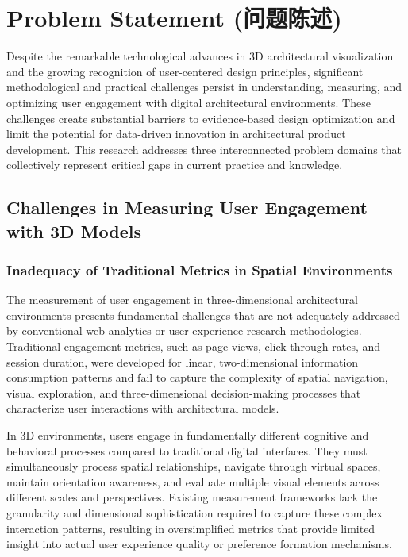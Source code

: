 \section{Problem Statement (问题陈述)}
\label{sec:problem_statement}

Despite the remarkable technological advances in 3D architectural visualization and the growing recognition of user-centered design principles, significant methodological and practical challenges persist in understanding, measuring, and optimizing user engagement with digital architectural environments. These challenges create substantial barriers to evidence-based design optimization and limit the potential for data-driven innovation in architectural product development. This research addresses three interconnected problem domains that collectively represent critical gaps in current practice and knowledge.

\subsection{Challenges in Measuring User Engagement with 3D Models}
\label{subsec:measuring_engagement_challenges}

\subsubsection{Inadequacy of Traditional Metrics in Spatial Environments}
\label{subsubsec:traditional_metrics_inadequacy}

The measurement of user engagement in three-dimensional architectural environments presents fundamental challenges that are not adequately addressed by conventional web analytics or user experience research methodologies. Traditional engagement metrics, such as page views, click-through rates, and session duration, were developed for linear, two-dimensional information consumption patterns and fail to capture the complexity of spatial navigation, visual exploration, and three-dimensional decision-making processes that characterize user interactions with architectural models.

In 3D environments, users engage in fundamentally different cognitive and behavioral processes compared to traditional digital interfaces. They must simultaneously process spatial relationships, navigate through virtual spaces, maintain orientation awareness, and evaluate multiple visual elements across different scales and perspectives. Existing measurement frameworks lack the granularity and dimensional sophistication required to capture these complex interaction patterns, resulting in oversimplified metrics that provide limited insight into actual user experience quality or preference formation mechanisms.

